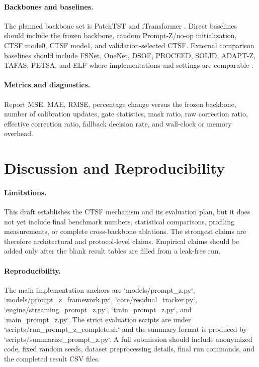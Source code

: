 \documentclass[10pt]{article}
\begin{document}
\paragraph{Backbones and baselines.}
The planned backbone set is PatchTST and iTransformer \cite{liu2024itransformer}. Direct baselines should include the frozen backbone, random Prompt-Z/no-op initialization, CTSF mode0, CTSF mode1, and validation-selected CTSF. External comparison baselines should include FSNet, OneNet, DSOF, PROCEED, SOLID, ADAPT-Z, TAFAS, PETSA, and ELF where implementations and settings are comparable \cite{pham2023fsnet,wen2023onenet,lau2025dsof,zhao2025proceed,chen2024solid,huang2026adaptz,kim2025tafas,medeiros2025petsa,lee2025elf}.

\paragraph{Metrics and diagnostics.}
Report MSE, MAE, RMSE, percentage change versus the frozen backbone, number of calibration updates, gate statistics, mask ratio, raw correction ratio, effective correction ratio, fallback decision rate, and wall-clock or memory overhead.


\section{Discussion and Reproducibility}
\paragraph{Limitations.}
This draft establishes the CTSF mechanism and its evaluation plan, but it does not yet include final benchmark numbers, statistical comparisons, profiling measurements, or complete cross-backbone ablations. The strongest claims are therefore architectural and protocol-level claims. Empirical claims should be added only after the blank result tables are filled from a leak-free run.

\paragraph{Reproducibility.}
The main implementation anchors are `models/prompt_z.py`, `models/prompt_z_framework.py`, `core/residual_tracker.py`, `engine/streaming_prompt_z.py`, `train_prompt_z.py`, and `main_prompt_z.py`. The strict evaluation scripts are under `scripts/run_prompt_z_complete.sh` and the summary format is produced by `scripts/summarize_prompt_z.py`. A full submission should include anonymized code, fixed random seeds, dataset preprocessing details, final run commands, and the completed result CSV files.



\end{document}
